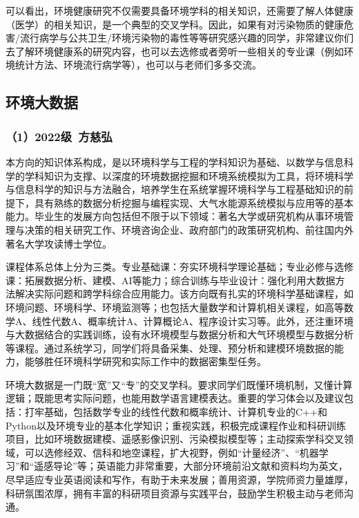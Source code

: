 \documentclass[11pt,oneside]{book}
\begin{document}
\vspace{10pt}

可以看出，环境健康研究不仅需要具备环境学科的相关知识，还需要了解人体健康（医学）的相关知识，是一个典型的交叉学科。因此，如果有对污染物质的健康危害/流行病学与公共卫生/环境污染物的毒性等等研究感兴趣的同学，非常建议你们去了解环境健康系的研究内容，也可以去选修或者旁听一些相关的专业课（例如环境统计方法、环境流行病学等），也可以与老师们多多交流。

\subsection{环境大数据}

\subsubsection{（1）2022级\ 方慈弘}

本方向的知识体系构成，是以环境科学与工程的学科知识为基础、以数学与信息科学的学科知识为支撑、以深度的环境数据挖掘和环境系统模拟为工具，将环境科学与信息科学的知识与方法融合，培养学生在系统掌握环境科学与工程基础知识的前提下，具有熟练的数据分析挖掘与编程实现、大气水能源系统模拟与应用等的基本能力。毕业生的发展方向包括但不限于以下领域：著名大学或研究机构从事环境管理与决策的相关研究工作、环境咨询企业、政府部门的政策研究机构、前往国内外著名大学攻读博士学位。

\vspace{10pt}

课程体系总体上分为三类。专业基础课：夯实环境科学理论基础；专业必修与选修课：拓展数据分析、建模、AI等能力；综合训练与毕业设计：强化利用大数据方法解决实际问题和跨学科综合应用能力。该方向既有扎实的环境科学基础课程，如环境问题、环境科学、环境监测等；也包括大量数学和计算机相关课程，如高等数学A、线性代数A、概率统计A、计算概论A、程序设计实习等。此外，还注重环境与大数据结合的实践训练，设有水环境模型与数据分析和大气环境模型与数据分析等课程。通过系统学习，同学们将具备采集、处理、预分析和建模环境数据的能力，能够胜任环境科学研究和实际工作中的数据密集型任务。

\vspace{10pt}

环境大数据是一门既“宽”又“专”的交叉学科。要求同学们既懂环境机制，又懂计算逻辑；既能思考实际问题，也能用数学语言建模表达。重要的学习体会以及建议包括：打牢基础，包括数学专业的线性代数和概率统计、计算机专业的C++和Python以及环境专业的基本化学知识；重视实践，积极完成课程作业和科研训练项目，比如环境数据建模、遥感影像识别、污染模拟模型等；主动探索学科交叉领域，可以选修经双、信科和地空课程，扩大视野，例如“计量经济”、“机器学习”和“遥感导论”等；英语能力非常重要，大部分环境前沿文献和资料均为英文，尽早适应专业英语阅读和写作，有助于未来发展；善用资源，学院师资力量雄厚，科研氛围浓厚，拥有丰富的科研项目资源与实践平台，鼓励学生积极主动与老师沟通。
\end{document}
